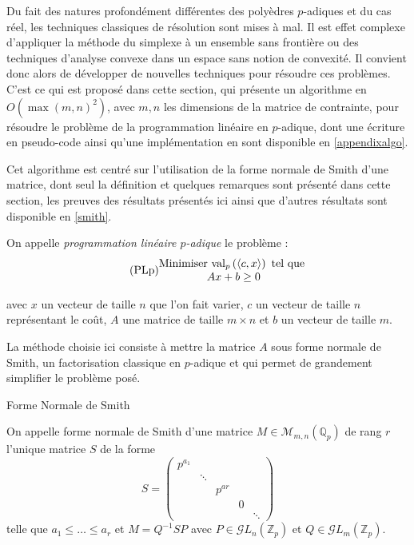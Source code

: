 \begin{definition}
	Du fait des natures profondément différentes des polyèdres $p$-adiques et du cas réel, les techniques classiques de résolution sont mises à mal. Il est effet complexe d'appliquer la méthode du simplexe à un ensemble sans frontière ou des techniques d'analyse convexe dans un espace sans notion de convexité. Il convient donc alors de développer de nouvelles techniques pour résoudre ces problèmes. C'est ce qui est proposé dans cette section, qui présente un algorithme en $O( \max\left( m,n \right)^2 )$, avec $m,n$ les dimensions de la matrice de contrainte, pour résoudre le problème de la programmation linéaire en $p$-adique, dont une écriture en pseudo-code ainsi qu'une implémentation en \sage sont disponible en \ref{appendixalgo}.

	Cet algorithme est centré sur l'utilisation de la forme normale de Smith d'une matrice, dont seul la définition et quelques remarques sont présenté dans cette section, les preuves des résultats présentés ici ainsi que d'autres résultats sont disponible en \ref{smith}.

	On appelle \textit{programmation linéaire $p$-adique} le problème :
\begin{equation}
	  \tag{PLp}
\begin{matrix}
	\text{Minimiser } \text{val}_p\left(\left<c,x \right>\right) \text{ tel que }\\
	Ax + b \ge 0
 \end{matrix}
	    \label{eqn:Proglinp}
\end{equation}

avec $x$ un vecteur de taille $n$ que l'on fait varier, $c$ un vecteur de taille $n$ représentant le coût, $A$ une matrice de taille $m \times n $ et $b$ un vecteur de taille $m$.

La méthode choisie ici consiste à mettre la matrice $A$ sous forme normale de Smith, un factorisation classique en $p$-adique et qui permet de grandement simplifier le problème posé.

\begin{definition}
	Forme Normale de Smith

		On appelle forme normale de Smith d'une matrice $M \in \mathcal{M}_{m,n}\left(\mathbb{Q}_{p} \right) $ de rang $r$ l'unique matrice $S$ de la forme $$S =  
	\begin{pmatrix} p^{a_1} & \\
		 & \ddots \\
		 & & p^{ar}\\
		 & & & 0\\
		 & & & & \ddots \end{pmatrix} $$
		 telle que $a_1\le  \ldots\le a_r$ et $M =  Q^{-1} S P$ avec $P \in \mathcal{G}L_n\left( \mathbb{Z}_p \right) $ et $Q \in \mathcal{G}L_m\left( \mathbb{Z}_p \right) $.
\end{definition}


\end{definition}
